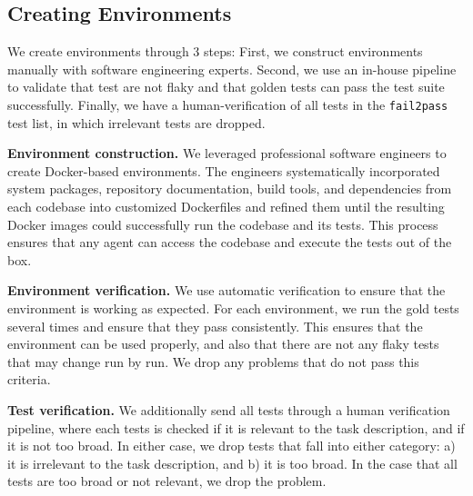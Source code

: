 \subsection{Creating Environments}

We create environments through 3 steps: First, we construct environments manually with software engineering experts. Second, we use an in-house pipeline to validate that test are not flaky and that golden tests can pass the test suite successfully. Finally, we have a human-verification of all tests in the \texttt{fail2pass} test list, in which irrelevant tests are dropped.

\textbf{Environment construction.} We leveraged professional software engineers to create Docker-based environments. The engineers systematically incorporated system packages, repository documentation, build tools, and dependencies from each codebase into customized Dockerfiles and refined them until the resulting Docker images could successfully run the codebase and its tests. This process ensures that any agent can access the codebase and execute the tests out of the box.

\textbf{Environment verification.} We use automatic verification to ensure that the environment is working as expected. For each environment, we run the gold tests several times and ensure that they pass consistently. This ensures that the environment can be used properly, and also that there are not any flaky tests that may change run by run. We drop any problems that do not pass this criteria.

\textbf{Test verification.} We additionally send all tests through a human verification pipeline, where each tests is checked if it is relevant to the task description, and if it is not too broad. In either case, we drop tests that fall into either category: a) it is irrelevant to the task description, and b) it is too broad. In the case that all tests are too broad or not relevant, we drop the problem.




